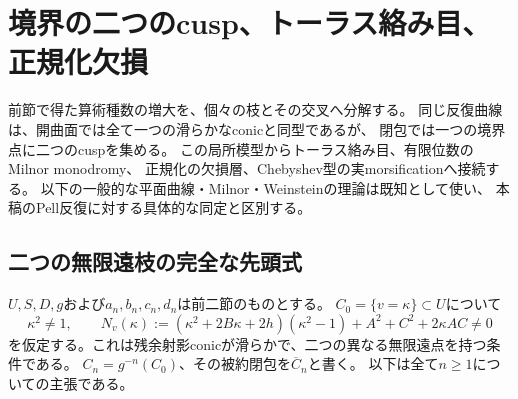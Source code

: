 \section{境界の二つのcusp、トーラス絡み目、正規化欠損}
\label{sec:boundary-torus-links}
前節で得た算術種数の増大を、個々の枝とその交叉へ分解する。
同じ反復曲線は、開曲面では全て一つの滑らかなconicと同型であるが、
閉包では一つの境界点に二つのcuspを集める。
この局所模型からトーラス絡み目、有限位数のMilnor monodromy、
正規化の欠損層、Chebyshev型の実morsificationへ接続する。
以下の一般的な平面曲線・Milnor・Weinsteinの理論は既知として使い、
本稿のPell反復に対する具体的な同定と区別する。

\subsection{二つの無限遠枝の完全な先頭式}
$U,S,D,g$および$a_n,b_n,c_n,d_n$は前二節のものとする。
$C_0=\{v=\kappa\}\subset U$について
\begin{equation}\label{eq:boundary-conic-condition}
 \kappa^2\ne1,\qquad
 N_v(\kappa):=(\kappa^2+2B\kappa+2h)(\kappa^2-1)
             +A^2+C^2+2\kappa AC\ne0
\end{equation}
を仮定する。これは残余射影conicが滑らかで、二つの異なる無限遠点を持つ条件である。
$C_n=g^{-n}(C_0)$、その被約閉包を$\overline C_n$と書く。
以下は全て$n\ge1$についての主張である。

